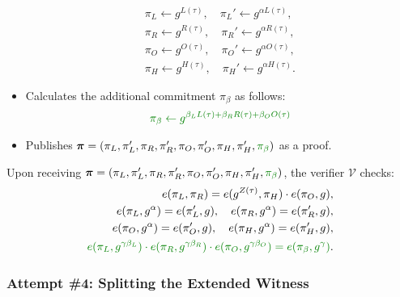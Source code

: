 \documentclass[../lecture-notes-148x210.tex]{subfiles}
\begin{document}
\begin{tcolorbox}
\begin{itemize}[label=]
\begin{align*}
            \pi_L \gets g^{L(\tau)}, \quad \pi_L' \gets g^{\alpha L(\tau)}, \\
            \pi_R \gets g^{R(\tau)}, \quad \pi_R' \gets g^{\alpha R(\tau)}, \\
            \pi_O \gets g^{O(\tau)}, \quad \pi_O' \gets g^{\alpha O(\tau)}, \\
            \pi_H \gets g^{H(\tau)}, \quad \pi_H' \gets g^{\alpha H(\tau)}.
        \end{align*}
        \item \textcolor{green!50!black}{Calculates the additional commitment $\pi_{\beta}$ as follows:}
        \begin{equation*}
            \textcolor{green!50!black}{\pi_{\beta} \gets g^{\beta_LL(\tau) + \beta_RR(\tau) + \beta_OO(\tau)}}
        \end{equation*}
        \item Publishes $\boldsymbol{\pi} = (\pi_L,\pi_L',\pi_R,\pi_R',\pi_O,\pi_O',\pi_H,\pi_H',\textcolor{green!50!black}{\pi_{\beta}})$ as a proof.
    \end{itemize}

    \newpage

    Upon receiving $\boldsymbol{\pi} = (\pi_L,\pi_L',\pi_R,\pi_R',\pi_O,\pi_O',\pi_H,\pi_H',\textcolor{green!50!black}{\pi_{\beta}})$, the verifier $\mathcal{V}$ checks:
    \begin{align*}
        e(\pi_L, \pi_R) = e(g^{Z(\tau)}, \pi_H) \cdot e(\pi_O, g), \\
        e(\pi_L, g^{\alpha}) = e(\pi_L', g), \quad e(\pi_R, g^{\alpha}) = e(\pi_R', g), \\
        e(\pi_O, g^{\alpha}) = e(\pi_O', g), \quad e(\pi_H, g^{\alpha}) = e(\pi_H', g), \\
        \textcolor{green!50!black}{e(\pi_L, g^{\gamma\beta_L}) \cdot e(\pi_R, g^{\gamma\beta_R}) \cdot e(\pi_O, g^{\gamma\beta_O}) = e(\pi_{\beta}, g^{\gamma})}.
    \end{align*}
\end{tcolorbox}

\subsubsection{Attempt \#4: Splitting the Extended Witness}
\end{document}
